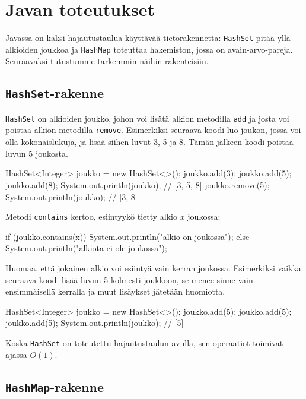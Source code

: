 \section{Javan toteutukset}

Javassa on kaksi hajautustaulua käyttävää tietorakennetta:
\texttt{HashSet} pitää yllä alkioiden joukkoa
ja \texttt{HashMap} toteuttaa
hakemiston, jossa on avain-arvo-pareja.
Seuraavaksi tutustumme tarkemmin näihin rakenteisiin.

\subsection{\texttt{HashSet}-rakenne}

\texttt{HashSet} on alkioiden joukko,
johon voi lisätä alkion metodilla \texttt{add}
ja josta voi poistaa alkion metodilla \texttt{remove}.
Esimerkiksi seuraava koodi luo joukon, jossa voi olla
kokonaislukuja, ja lisää siihen luvut 3, 5 ja 8.
Tämän jälkeen koodi poistaa luvun 5 joukosta.

\begin{code}
HashSet<Integer> joukko = new HashSet<>();
joukko.add(3);
joukko.add(5);
joukko.add(8);
System.out.println(joukko); // [3, 5, 8]
joukko.remove(5);
System.out.println(joukko); // [3, 8]
\end{code}

Metodi \texttt{contains} kertoo, esiintyykö tietty alkio $x$ joukossa:

\begin{code}
if (joukko.contains(x)) {
    System.out.println("alkio on joukossa");
} else {
    System.out.println("alkiota ei ole joukossa");
}
\end{code}

Huomaa, että jokainen alkio voi esiintyä vain kerran joukossa.
Esimerkiksi vaikka seuraava koodi lisää luvun 5 kolmesti
joukkoon, se menee sinne vain ensimmäisellä kerralla ja
muut lisäykset jätetään huomiotta.

\begin{code}
HashSet<Integer> joukko = new HashSet<>();
joukko.add(5);
joukko.add(5);
joukko.add(5);
System.out.println(joukko); // [5]
\end{code}

Koska \texttt{HashSet} on toteutettu hajautustaulun avulla,
sen operaatiot toimivat ajassa $O(1)$.

\subsection{\texttt{HashMap}-rakenne}

